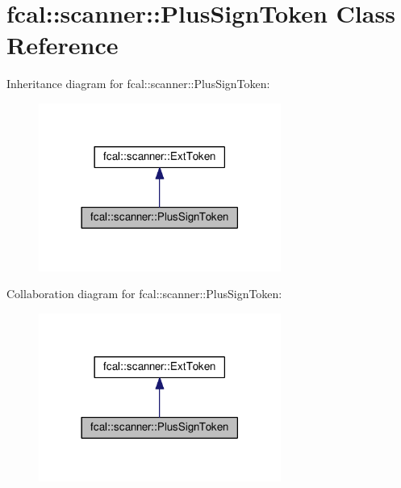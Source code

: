\hypertarget{classfcal_1_1scanner_1_1PlusSignToken}{}\section{fcal\+:\+:scanner\+:\+:Plus\+Sign\+Token Class Reference}
\label{classfcal_1_1scanner_1_1PlusSignToken}


Inheritance diagram for fcal\+:\+:scanner\+:\+:Plus\+Sign\+Token\+:
\nopagebreak
\begin{figure}[H]
\begin{center}
\leavevmode
\includegraphics[width=225pt]{classfcal_1_1scanner_1_1PlusSignToken__inherit__graph}
\end{center}
\end{figure}


Collaboration diagram for fcal\+:\+:scanner\+:\+:Plus\+Sign\+Token\+:
\nopagebreak
\begin{figure}[H]
\begin{center}
\leavevmode
\includegraphics[width=225pt]{classfcal_1_1scanner_1_1PlusSignToken__coll__graph}
\end{center}
\end{figure}
